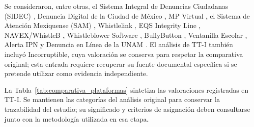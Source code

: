 Se consideraron, entre otras, el Sistema Integral de Denuncias Ciudadanas (SIDEC) \cite{sfp_sidec}, Denuncia Digital de la Ciudad de México \cite{cdmx_denuncia_digital}, MP Virtual \cite{fgjcdmx_mp_virtual}, el Sistema de Atención Mexiquense (SAM) \cite{secogem_sam}, Whistlelink \cite{whistlelink}, EQS Integrity Line \cite{eqs_integrity_line}, NAVEX/WhistleB \cite{navex_whistleb}, Whistleblower Software \cite{whistleblower_software}, BullyButton \cite{bully_button}, Ventanilla Escolar \cite{sep_ventanilla_escolar}, Alerta IPN \cite{ipn_alerta} y Denuncia en Línea de la UNAM \cite{unam_ddu_denuncia}. El análisis de TT-I también incluyó Incorruptible, cuya valoración se conserva para respetar la comparativa original; esta entrada requiere recuperar su fuente documental específica si se pretende utilizar como evidencia independiente.

La Tabla~\ref{tab:comparativa_plataformas} sintetiza las valoraciones registradas en TT-I. Se mantienen las categorías del análisis original para conservar la trazabilidad del estudio; su significado y criterios de asignación deben consultarse junto con la metodología utilizada en esa etapa.

